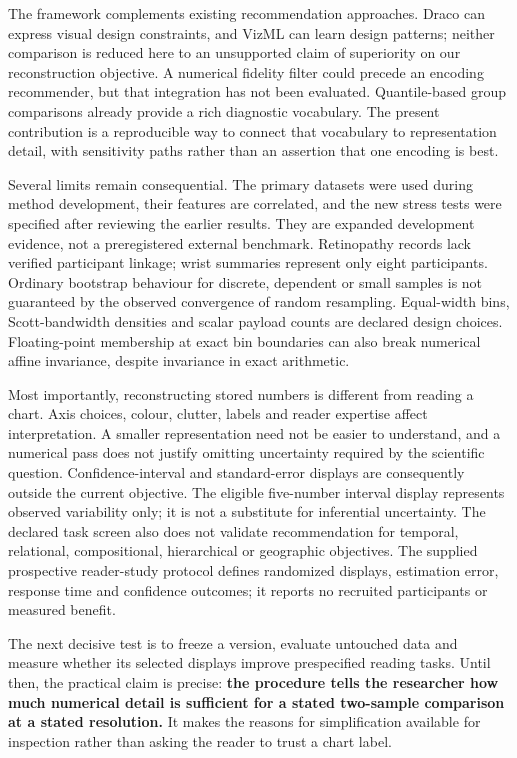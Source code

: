 \documentclass[11pt]{article}
\begin{document}
The framework complements existing recommendation approaches. Draco can express visual design constraints, and VizML can learn design patterns; neither comparison is reduced here to an unsupported claim of superiority on our reconstruction objective.\cite{draco,vizml} A numerical fidelity filter could precede an encoding recommender, but that integration has not been evaluated. Quantile-based group comparisons already provide a rich diagnostic vocabulary.\cite{rousselet2017} The present contribution is a reproducible way to connect that vocabulary to representation detail, with sensitivity paths rather than an assertion that one encoding is best.

Several limits remain consequential. The primary datasets were used during method development, their features are correlated, and the new stress tests were specified after reviewing the earlier results. They are expanded development evidence, not a preregistered external benchmark. Retinopathy records lack verified participant linkage; wrist summaries represent only eight participants. Ordinary bootstrap behaviour for discrete, dependent or small samples is not guaranteed by the observed convergence of random resampling. Equal-width bins, Scott-bandwidth densities and scalar payload counts are declared design choices. Floating-point membership at exact bin boundaries can also break numerical affine invariance, despite invariance in exact arithmetic.

Most importantly, reconstructing stored numbers is different from reading a chart. Axis choices, colour, clutter, labels and reader expertise affect interpretation.\cite{cleveland1984,crameri2020} A smaller representation need not be easier to understand, and a numerical pass does not justify omitting uncertainty required by the scientific question. Confidence-interval and standard-error displays are consequently outside the current objective. The eligible five-number interval display represents observed variability only; it is not a substitute for inferential uncertainty. The declared task screen also does not validate recommendation for temporal, relational, compositional, hierarchical or geographic objectives. The supplied prospective reader-study protocol defines randomized displays, estimation error, response time and confidence outcomes; it reports no recruited participants or measured benefit.

The next decisive test is to freeze a version, evaluate untouched data and measure whether its selected displays improve prespecified reading tasks. Until then, the practical claim is precise: \textbf{the procedure tells the researcher how much numerical detail is sufficient for a stated two-sample comparison at a stated resolution.} It makes the reasons for simplification available for inspection rather than asking the reader to trust a chart label.
\end{document}
